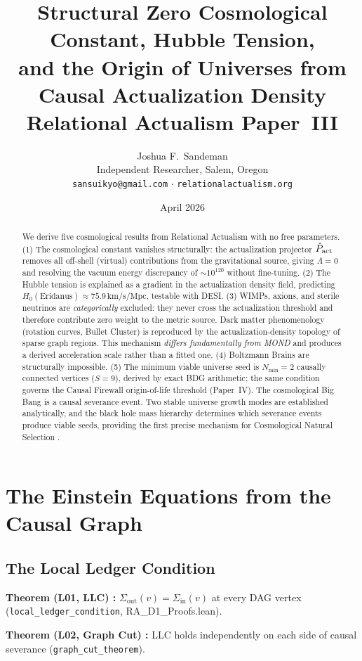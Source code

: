 \documentclass[12pt,a4paper]{article}
\title{\textbf{Structural Zero Cosmological Constant, Hubble Tension,\\
and the Origin of Universes from Causal Actualization Density}\\[0.4em]
\large\normalfont Relational Actualism Paper~III}
\author{Joshua F.~Sandeman\\[0.3em]
\small Independent Researcher, Salem, Oregon\\
\small \texttt{sansuikyo@gmail.com} $\cdot$ \texttt{relationalactualism.org}}
\date{April 2026}
\begin{document}
\maketitle
\begin{abstract}
We derive five cosmological results from Relational Actualism with no free parameters.  (1) The cosmological constant vanishes structurally: the actualization projector $\hat{P}_{\mathrm{act}}$ removes all off-shell (virtual) contributions from the gravitational source, giving $\Lambda=0$ and resolving the vacuum energy discrepancy of $\sim10^{120}$ without fine-tuning.  (2) The Hubble tension is explained as a gradient in the actualization density field, predicting $H_0(\text{Eridanus})\approx 75.9\,\mathrm{km/s/Mpc}$, testable with DESI.  (3) WIMPs, axions, and sterile neutrinos are \emph{categorically} excluded: they never cross the actualization threshold and therefore contribute zero weight to the metric source.  Dark matter phenomenology (rotation curves, Bullet Cluster) is reproduced by the actualization-density topology of sparse graph regions.  This mechanism \emph{differs fundamentally from MOND} and produces a derived acceleration scale rather than a fitted one.  (4) Boltzmann Brains are structurally impossible.  (5) The minimum viable universe seed is $N_{\min}=2$ causally connected vertices ($S=9$), derived by exact BDG arithmetic; the same condition governs the Causal Firewall origin-of-life threshold (Paper~IV).  The cosmological Big Bang is a causal severance event.  Two stable universe growth modes are established analytically, and the black hole mass hierarchy determines which severance events produce viable seeds, providing the first precise mechanism for Cosmological Natural Selection \cite{Smolin1992}.
\end{abstract}

\tableofcontents

\section{The Einstein Equations from the Causal Graph}

\subsection{The Local Ledger Condition}

\begin{leanbox}
\textbf{Theorem (L01, LLC) \statusLV:} $\Sigma_{\mathrm{out}}(v) = \Sigma_{\mathrm{in}}(v)$ at every DAG vertex (\texttt{local\_ledger\_condition}, RA\_D1\_Proofs.lean).

\textbf{Theorem (L02, Graph Cut) \statusLV:} LLC holds independently on each side of causal severance (\texttt{graph\_cut\_theorem}).
\end{leanbox}
\end{document}
